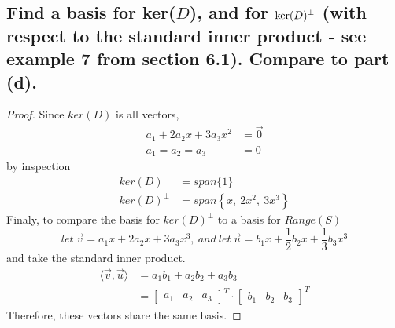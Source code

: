 \documentclass[../main.tex]{subfiles}
\begin{document}
\subsection{Find a basis for ker($D$), and for ${\rm ker}(D)^{\perp}$ (with respect to the standard inner product - see example 7 from section 6.1). Compare to part (d).}
\begin{proof}
        Since $\displaystyle ker( D)$ is all vectors,
        \begin{align*}
                a_{1} +2a_{2} x+3a_{3} x^{2} & =\vec{0} \\
                a_{1} =a_{2} =a_{3}          & =0
        \end{align*}
        by inspection
        \begin{align*}
                ker( D)          & =span\{1\}                               \\
                ker( D)^{\perp } & =span\left\{x,\ 2x^{2} ,\ 3x^{3}\right\}
        \end{align*}
        Finaly, to compare the basis for $\displaystyle ker( D)^{\perp }$ to a basis for $\displaystyle Range( S)$
        \begin{equation*}
                let\ \vec{v} =a_{1} x+2a_{2} x+3a_{3} x^{3} ,\ and\ let\ \vec{u} =b_{1} x+\frac{1}{2} b_{2} x+\frac{1}{3} b_{3} x^{3}
        \end{equation*}
        and take the standard inner product.
        \begin{align*}
                \langle \vec{v} ,\vec{u} \rangle & =a_{1} b_{1} +a_{2} b_{2} +a_{3} b_{3}                               \\
                                                 & =\begin{bmatrix}
                        a_{1} & a_{2} & a_{3}
                \end{bmatrix}^{T} \cdot \begin{bmatrix}
                        b_{1} & b_{2} & b_{3}
                \end{bmatrix}^{T}
        \end{align*}
        Therefore, these vectors share the same basis.
\end{proof}
\end{document}
